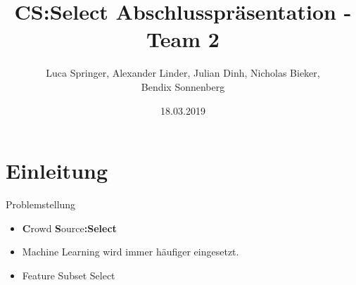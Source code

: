 \documentclass[xcolor=dvipsnames]{beamer}
\title[Team 2 - Abschlusspräsentation]{CS:Select Abschlusspräsentation - Team 2}
\author{Luca Springer, Alexander Linder, Julian Dinh, Nicholas Bieker,\\ Bendix Sonnenberg}
\date{18.03.2019}
\begin{document}
    \frame[plain]{\titlepage}

    \section{Einleitung}

    \begin{frame}{Problemstellung}
        \begin{itemize}
            \item \textbf{C}rowd \textbf{S}ource\textbf{:Select}
            \item Machine Learning wird immer häufiger eingesetzt.
            \item Feature Subset Select
        \end{itemize}
    \end{frame}
    
\end{document}
